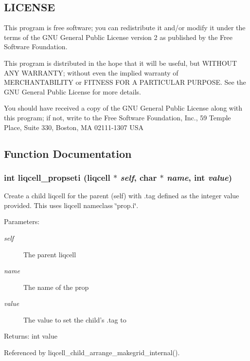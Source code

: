 \subsection{LICENSE}\label{d7/db4/liqcell__prop_8c_LICENSE}
This program is free software; you can redistribute it and/or modify it under the terms of the GNU General Public License version 2 as published by the Free Software Foundation.

This program is distributed in the hope that it will be useful, but WITHOUT ANY WARRANTY; without even the implied warranty of MERCHANTABILITY or FITNESS FOR A PARTICULAR PURPOSE. See the GNU General Public License for more details.

You should have received a copy of the GNU General Public License along with this program; if not, write to the Free Software Foundation, Inc., 59 Temple Place, Suite 330, Boston, MA 02111-1307 USA 

\subsection{Function Documentation}
\subsubsection[{liqcell\_\-propseti}]{\setlength{\rightskip}{0pt plus 5cm}int liqcell\_\-propseti (liqcell $\ast$ {\em self}, \/  char $\ast$ {\em name}, \/  int {\em value})}\label{d7/db4/liqcell__prop_8c_84d505dda856299bc51da9d0871ca7b2}


Create a child liqcell for the parent (self) with .tag defined as the integer value provided. This uses liqcell nameclass \char`\"{}prop.i\char`\"{}.

\begin{Desc}
\item[Parameters:]
\begin{description}
\item[{\em self}]The parent liqcell \item[{\em name}]The name of the prop \item[{\em value}]The value to set the child's .tag to \end{description}
\end{Desc}
\begin{Desc}
\item[Returns:]int value \end{Desc}


Referenced by liqcell\_\-child\_\-arrange\_\-makegrid\_\-internal().